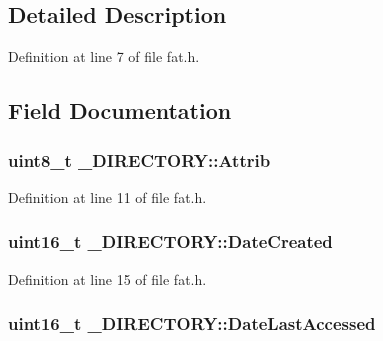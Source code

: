 \subsection{Detailed Description}


Definition at line 7 of file fat.\+h.



\subsection{Field Documentation}
\subsubsection[{\texorpdfstring{Attrib}{Attrib}}]{\setlength{\rightskip}{0pt plus 5cm}uint8\+\_\+t \+\_\+\+D\+I\+R\+E\+C\+T\+O\+R\+Y\+::\+Attrib}\hypertarget{struct__DIRECTORY_a01c9dc5d98375e3205b87b3188165413}{}\label{struct__DIRECTORY_a01c9dc5d98375e3205b87b3188165413}


Definition at line 11 of file fat.\+h.

\subsubsection[{\texorpdfstring{Date\+Created}{DateCreated}}]{\setlength{\rightskip}{0pt plus 5cm}uint16\+\_\+t \+\_\+\+D\+I\+R\+E\+C\+T\+O\+R\+Y\+::\+Date\+Created}\hypertarget{struct__DIRECTORY_a7a4fe27d7f0751594dd0d7f458c5dff0}{}\label{struct__DIRECTORY_a7a4fe27d7f0751594dd0d7f458c5dff0}


Definition at line 15 of file fat.\+h.

\subsubsection[{\texorpdfstring{Date\+Last\+Accessed}{DateLastAccessed}}]{\setlength{\rightskip}{0pt plus 5cm}uint16\+\_\+t \+\_\+\+D\+I\+R\+E\+C\+T\+O\+R\+Y\+::\+Date\+Last\+Accessed}\hypertarget{struct__DIRECTORY_a779c681de0304d76409a3783cafda05c}{}\label{struct__DIRECTORY_a779c681de0304d76409a3783cafda05c}


